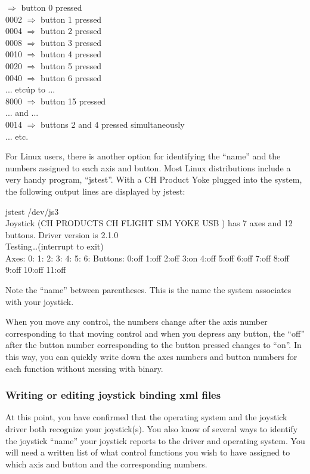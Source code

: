  $\Rightarrow$ button 0 pressed\\
  0002 $\Rightarrow$ button 1 pressed\\
  0004 $\Rightarrow$ button 2 pressed\\
  0008 $\Rightarrow$ button 3 pressed\\
  0010 $\Rightarrow$ button 4 pressed\\
  0020 $\Rightarrow$ button 5 pressed\\
  0040 $\Rightarrow$ button 6 pressed\\
  ... etc\. up to ...\\
  8000 $\Rightarrow$ button 15 pressed\\
  ... and ...\\
  0014 $\Rightarrow$ buttons 2 and 4 pressed simultaneously\\
  ... etc.
  \medskip

For Linux users, there is another option for identifying the ``name'' and the numbers assigned to each axis and button.  Most Linux distributions include a very handy program, ``jstest''.  With a CH Product Yoke plugged into the system, the following output lines are displayed by jstest:
\medskip

\begin{ttfamily}
\tiny
\noindent
jstest /dev/js3\\
Joystick (CH PRODUCTS CH FLIGHT SIM YOKE USB ) has 7 axes and 12 buttons. Driver version is 2.1.0\\
Testing\ldots (interrupt to exit)\\
Axes:  0:   1:   2:  3:  4:  5:  6: Buttons:  0:off  1:off  2:off  3:on  4:off  5:off  6:off  7:off 8:off 9:off 10:off  11:off\\
\end{ttfamily}

\noindent
Note the ``name'' between parentheses.  This is the name the system associates with your joystick.

When you move any control, the numbers change after the axis number corresponding to that moving control and when you depress any button, the ``off'' after the button number corresponding to the button pressed changes to ``on''.  In this way, you can quickly write down the axes numbers and button numbers for each function without messing with binary.

\subsubsection{Writing or editing joystick binding xml files\label{writing}}
At this point, you have confirmed that the operating system and the joystick driver both recognize your joystick(s).  You also know of several ways to identify the joystick ``name'' your joystick reports to the driver and operating system.  You will need a written list of what control functions you wish to have assigned to which axis and button and the corresponding numbers.

